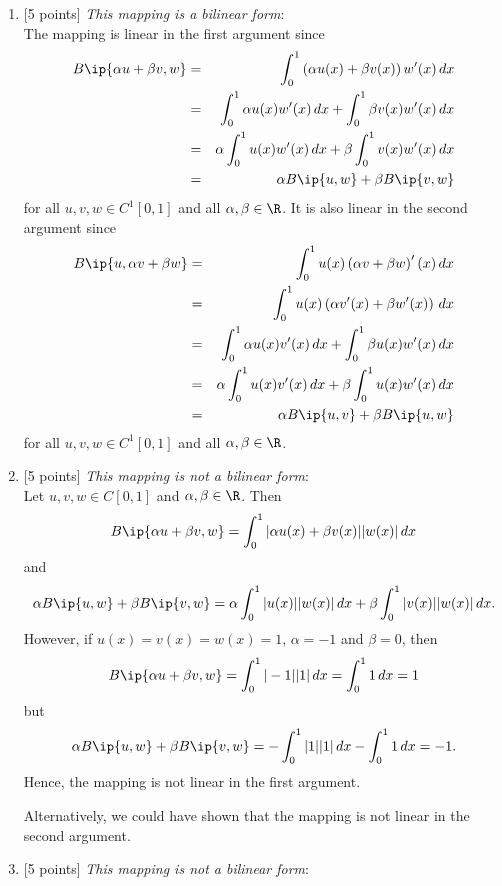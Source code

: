 \begin{solution}
\begin{enumerate}
\item {[5 points]} \emph{This mapping is a bilinear form}:\\

The mapping is linear in the first argument since
\begin{eqnarray*}
B\ip{\alpha u + \beta v, w}&=& \int_0^1 \left(\alpha u(x) + \beta v(x)\right) w'(x)\,dx
\\
&=&  \int_0^1\alpha u(x) w'(x) \,dx + \int_0^1\beta v(x) w'(x)\,dx
\\
&=& \alpha \int_0^1 u(x) w'(x) \,dx + \beta\int_0^1 v(x) w'(x)\,dx
\\
&=& \alpha B\ip{u,w} + \beta B\ip{v,w}
\end{eqnarray*}
for all $u,v,w\in C^1[0,1]$ and all $\alpha,\beta\in\R$. It is also linear in the second argument since
\begin{eqnarray*}
B\ip{u,\alpha v+\beta w}&=& \int_0^1 u(x) \left(\alpha v + \beta w\right)'(x)\,dx
\\
&=& \int_0^1 u(x) \left(\alpha v'(x) + \beta w'(x)\right)\,dx
\\
&=&  \int_0^1\alpha u(x) v'(x) \,dx + \int_0^1\beta u(x) w'(x)\,dx
\\
&=& \alpha \int_0^1 u(x) v'(x) \,dx + \beta\int_0^1 u(x) w'(x)\,dx
\\
&=& \alpha B\ip{u,v} + \beta B\ip{u,w}
\end{eqnarray*}
for all $u,v,w\in C^1[0,1]$ and all $\alpha,\beta\in\R$.

\item {[5 points]} \emph{This mapping is not a bilinear form}:\\

Let $u,v,w\in C[0,1]$ and $\alpha,\beta\in\R$. Then
\[ B\ip{\alpha u+\beta v,w} = \int_0^1 |\alpha u(x)+\beta v(x)| |w(x)|\, d x\]
and
\[ \alpha B\ip{u,w} + \beta B\ip{v,w} = \alpha\int_0^1 |u(x)| |w(x)|\, d x+\beta\int_0^1 |v(x)| |w(x)|\, d x.\]
However, if $u(x)=v(x)=w(x)=1$, $\alpha=-1$ and $\beta=0$, then
\[ B\ip{\alpha u+\beta v,w} = \int_0^1 |-1| |1|\, d x=\int_0^1 1\, d x=1\]
but
\[ \alpha B\ip{u,w} + \beta B\ip{v,w} = -\int_0^1 |1| |1|\, d x -\int_0^1 1\, d x=-1.\]
Hence, the mapping is not linear in the first argument.

Alternatively, we could have shown that the mapping is not linear in the second argument.

\item {[5 points]} \emph{This mapping is not a bilinear form}:\\


\end{enumerate}
\end{solution}
